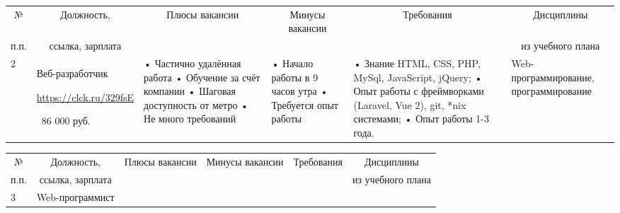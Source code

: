 \documentclass[14pt]{extreport}
\begin{document}
\begin{landscape}
\begin{table}[H]
	\begin{center}
		\begin{small}
		\begin{tabular}{|p{0.1cm}|p{5cm}|p{4.5cm}|p{4.5cm}|p{4cm}|p{3cm}|} \hline
			\multicolumn{1}{|c|}{№}&\multicolumn{1}{c|}{Должность,}&\multicolumn{1}{c|}{Плюсы вакансии}&\multicolumn{1}{c|}{Минусы вакансии}&\multicolumn{1}{c|}{Требования}&\multicolumn{1}{c|}{Дисциплины}\\ 
			\multicolumn{1}{|c|}{п.п.}&\multicolumn{1}{c|}{ссылка, зарплата}&\multicolumn{1}{c|}{}&\multicolumn{1}{c|}{}&\multicolumn{1}{c|}{}&\multicolumn{1}{c|}{из учебного плана}\\ 
			\hline
			    2 & Веб-разработчик
			
    			\url{https://clck.ru/329fsE}
    			
    			~86 000 руб. &
    			• Частично удалённая работа
    			\newline• Обучение за счёт компании
    			\newline• Шаговая доступность от метро
    			\newline• Не много требований
    			&
    			• Начало работы в 9 часов утра
    			\newline• Требуется опыт работы
    			&
    			• Знание HTML, CSS, PHP, MySql, JavaScript, jQuery;
    			\newline• Опыт работы с фреймворками (Laravel, Vue 2), git, *nix системами;
    			\newline• Опыт работы 1-3 года.
    			&
    			Web-программирование, программирование
    			\\
    			\hline
		\end{tabular}
	\end{small}
	\end{center}
\end{table}  
\begin{table}[H]
	\begin{center}
		\begin{small}
		\begin{tabular}{|p{0.1cm}|p{5cm}|p{4.5cm}|p{4.5cm}|p{4cm}|p{3cm}|} \hline
			\multicolumn{1}{|c|}{№}&\multicolumn{1}{c|}{Должность,}&\multicolumn{1}{c|}{Плюсы вакансии}&\multicolumn{1}{c|}{Минусы вакансии}&\multicolumn{1}{c|}{Требования}&\multicolumn{1}{c|}{Дисциплины}\\ 
			\multicolumn{1}{|c|}{п.п.}&\multicolumn{1}{c|}{ссылка, зарплата}&\multicolumn{1}{c|}{}&\multicolumn{1}{c|}{}&\multicolumn{1}{c|}{}&\multicolumn{1}{c|}{из учебного плана}\\ 
			\hline
				3 & Web-программист
				

\end{tabular}
\end{small}
\end{center}
\end{table}
\end{landscape}
\end{document}
